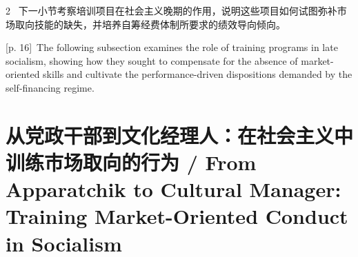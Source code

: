 \documentclass[10pt,a4paper]{article}
\begin{document}
\begin{paracol}{2}
\switchcolumn*
{\scriptsize\color{gray} [p. 16]}\ 下一小节考察培训项目在社会主义晚期的作用，说明这些项目如何试图弥补市场取向技能的缺失，并培养自筹经费体制所要求的绩效导向倾向。\par
\switchcolumn
{\scriptsize\color{gray} [p. 16]}\ The following subsection examines the role of training programs in late socialism, showing how they sought to compensate for the absence of market-oriented skills and cultivate the performance-driven dispositions demanded by the self-financing regime.\par
\switchcolumn*
\end{paracol}
\section*{从党政干部到文化经理人：在社会主义中训练市场取向的行为 / From Apparatchik to Cultural Manager: Training Market-Oriented Conduct in Socialism}
\end{document}
